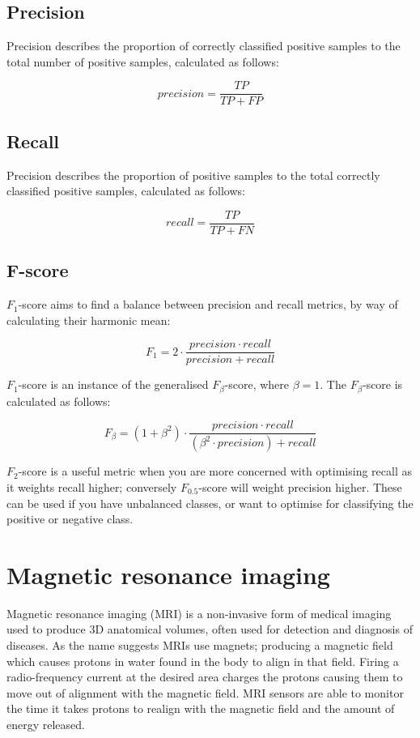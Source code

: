 \documentclass[
    author={Kai Hulme},
    supervisor={Dr Jon Bird},
    degree={BSc},
    title={Generative Adversarial Networks as an Augmentation Technique},
    subtitle={for Alzheimer's Disease Detection in MRI Volumes},
    type={Research},
    year={2021} 
]{dissertation}
\begin{document}
\subsection{Precision}

Precision describes the proportion of correctly classified positive samples to the total number of positive samples, calculated as follows:

\[ precision = \frac{TP}{TP + FP} \]

\subsection{Recall}

Precision describes the proportion of positive samples to the total correctly classified positive samples, calculated as follows:

\[ recall = \frac{TP}{TP + FN} \]

\subsection{F-score}

$F_1$-score aims to find a balance between precision and recall metrics, by way of calculating their harmonic mean:

\[ F_1 = 2 \cdot \frac{precision \cdot recall}{precision + recall} \]

$F_1$-score is an instance of the generalised $F_\beta$-score, where $\beta=1$. The $F_\beta$-score is calculated as follows:

\[ F_\beta = (1 + \beta^2) \cdot \frac{precision \cdot recall}{(\beta^2 \cdot precision) + recall} \]

$F_2$-score is a useful metric when you are more concerned with optimising recall as it weights recall higher; conversely $F_0.5$-score will weight precision higher. These can be used if you have unbalanced classes, or want to optimise for classifying the positive or negative class.


\section{Magnetic resonance imaging}

Magnetic resonance imaging (MRI) is a non-invasive form of medical imaging used to produce 3D anatomical volumes, often used for detection and diagnosis of diseases. As the name suggests MRIs use magnets; producing a magnetic field which causes protons in water found in the body to align in that field. Firing a radio-frequency current at the desired area charges the protons causing them to move out of alignment with the magnetic field. MRI sensors are able to monitor the time it takes protons to realign with the magnetic field and the amount of energy released. \cite{weller2018current} \\
\end{document}
